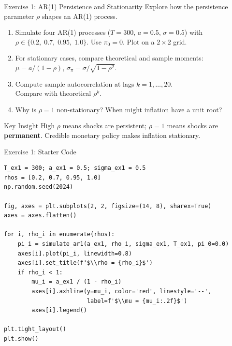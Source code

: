 \documentclass[aspectratio=169, 10pt]{beamer}
\begin{document}
\begin{frame}{Exercise 1: AR(1) Persistence and Stationarity}
Explore how the persistence parameter $\rho$ shapes an AR(1) process.
\vspace{0.3em}
\begin{enumerate}
  \item Simulate four AR(1) processes ($T = 300$, $a = 0.5$, $\sigma = 0.5$) with\\
        $\rho \in \{0.2,\; 0.7,\; 0.95,\; 1.0\}$. Use $\pi_0 = 0$.
        Plot on a $2 \times 2$ grid.
  \item For stationary cases, compare theoretical and sample moments:\\
        $\mu = a/(1-\rho)$, \; $\sigma_\pi = \sigma/\sqrt{1-\rho^2}$.
  \item Compute sample autocorrelation at lags $k = 1, \ldots, 20$.\\
        Compare with theoretical $\rho^k$.
  \item Why is $\rho = 1$ non-stationary? When might inflation have a unit root?
\end{enumerate}
\vspace{0.3em}
\begin{alertblock}{Key Insight}
High $\rho$ means shocks are persistent; $\rho = 1$ means shocks
are \textbf{permanent}. Credible monetary policy makes inflation stationary.
\end{alertblock}
\end{frame}

\begin{frame}[fragile]{Exercise 1: Starter Code}
\begin{lstlisting}
T_ex1 = 300; a_ex1 = 0.5; sigma_ex1 = 0.5
rhos = [0.2, 0.7, 0.95, 1.0]
np.random.seed(2024)

fig, axes = plt.subplots(2, 2, figsize=(14, 8), sharex=True)
axes = axes.flatten()

for i, rho_i in enumerate(rhos):
    pi_i = simulate_ar1(a_ex1, rho_i, sigma_ex1, T_ex1, pi_0=0.0)
    axes[i].plot(pi_i, linewidth=0.8)
    axes[i].set_title(f'$\\rho = {rho_i}$')
    if rho_i < 1:
        mu_i = a_ex1 / (1 - rho_i)
        axes[i].axhline(y=mu_i, color='red', linestyle='--',
                        label=f'$\\mu = {mu_i:.2f}$')
        axes[i].legend()

plt.tight_layout()
plt.show()
\end{lstlisting}
\end{frame}
\end{document}
